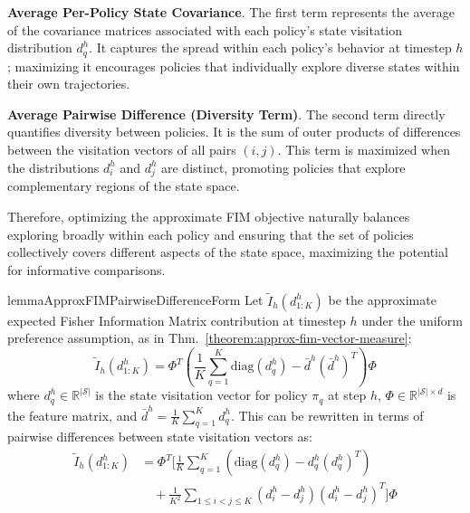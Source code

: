\documentclass{article}
\newcommand{\Scal}{\mathcal{S}}
\begin{document}
\noindent \textbf{Average Per-Policy State Covariance}. The first term represents the average of the covariance matrices associated with each policy's state visitation distribution $d^h_q$. It captures the spread within each policy's behavior at timestep $h$; maximizing it encourages policies that individually explore diverse states within their own trajectories.

\noindent \textbf{Average Pairwise Difference (Diversity Term)}. The second term directly quantifies diversity between policies. It is the sum of outer products of differences between the visitation vectors of all pairs $(i, j)$. This term is maximized when the distributions $d^h_i$ and $d^h_j$ are distinct, promoting policies that explore complementary regions of the state space.

Therefore, optimizing the approximate FIM objective naturally balances exploring broadly within each policy and ensuring that the set of policies collectively covers different aspects of the state space, maximizing the potential for informative comparisons.

\begin{restatable}{lemma}{ApproxFIMPairwiseDifferenceForm}
\label{lemma:approx-fim-pairwise-difference}
Let $\tilde{I}_h(d_{1:K}^h)$ be the approximate expected Fisher Information Matrix contribution at timestep $h$ under the uniform preference assumption, as in Thm.~\ref{theorem:approx-fim-vector-measure}:
\[
\tilde{I}_h(d_{1:K}^h)
= \Phi^T \left( \frac{1}{K} \sum_{q=1}^K \mathrm{diag}(d^h_q) - \bar{d}^h (\bar{d}^h)^T \right) \Phi
\]
where $d^h_q \in \mathbb{R}^{|\Scal|}$ is the state visitation vector for policy $\pi_q$ at step $h$, $\Phi \in \mathbb{R}^{|\Scal| \times d}$ is the feature matrix, and $\bar{d}^h = \frac{1}{K} \sum_{q=1}^K d^h_q$. This can be rewritten in terms of pairwise differences between state visitation vectors as:
\begin{align*}
\tilde{I}_h(d_{1:K}^h)
&= \Phi^T \Bigg[ \frac{1}{K} \sum_{q=1}^K \left( \mathrm{diag}(d^h_q) - d^h_q (d^h_q)^T \right) \\
&\quad + \frac{1}{K^2} \sum_{1 \le i < j \le K} (d^h_i - d^h_j)(d^h_i - d^h_j)^T \Bigg] \Phi
\end{align*}
\end{restatable}
\end{document}
